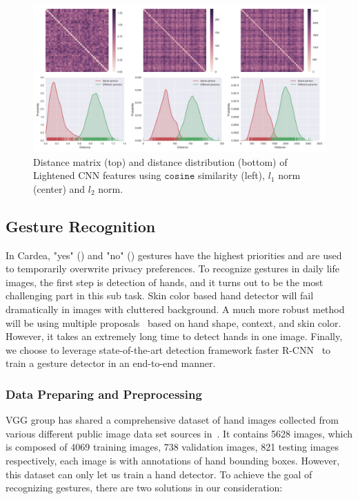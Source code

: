 \begin{figure}[!htbp]
    \centering
    \includegraphics[width=1.0\textwidth]{figure/ch4-mfmsim.png}
    \caption{Distance matrix (top) and distance distribution (bottom) of Lightened CNN features using $\mathtt{cosine}$ similarity (left), $l_1$ norm (center) and $l_2$ norm.}
    \label{fig:ch4-mfmsim}
\end{figure}


\subsection{Gesture Recognition}
In Cardea, "yes" () and "no" () gestures have the highest priorities and are used to temporarily overwrite privacy preferences. To recognize gestures in daily life images, the first step is detection of hands, and it turns out to be the most challenging part in this sub task. Skin color based hand detector will fail dramatically in images with cluttered background. A much more robust method will be using multiple proposals~\cite{mittal2011hand} based on hand shape, context, and skin color. However, it takes an extremely long time to detect hands in one image. Finally, we choose to leverage state-of-the-art detection framework faster R-CNN~\cite{ren2015faster} to train a gesture detector in an end-to-end manner.

\subsubsection{Data Preparing and Preprocessing}


VGG group has shared a comprehensive dataset of hand images collected from various different public image data set sources in~\cite{mittal2011hand, links:vgghanddataset}. It contains 5628 images, which is composed of 4069 training images, 738 validation images, 821 testing images respectively, each image is with annotations of hand bounding boxes. However, this dataset can only let us train a hand detector. To achieve the goal of recognizing gestures, there are two solutions in our consideration:

